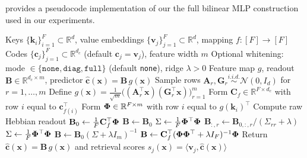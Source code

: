  provides a pseudocode implementation of our the full bilinear MLP construction used in our experiments.

\begin{algorithm}[t]
\caption{Sketched-$K_{2}$ Hebbian Construction with Optional Whitening}
\label{alg:sketched_k2_hebbian_whitening}
\begin{algorithmic}[1]
\REQUIRE Keys $\{\mathbf{k}_{i}\}_{i=1}^F\subset\mathbb{R}^d$, value embeddings $\{\mathbf{v}_{j}\}_{j=1}^F\subset\mathbb{R}^d$, mapping $f:[F]\to[F]$
\REQUIRE Codes $\{\mathbf{c}_{j}\}_{j=1}^F\subset\mathbb{R}^{d_c}$ (default $\mathbf{c}_{j}=\mathbf{v}_{j}$), feature width $m$
\REQUIRE Optional whitening: mode $\in\{\texttt{none},\texttt{diag},\texttt{full}\}$ (default \texttt{none}), ridge $\lambda>0$
\ENSURE Feature map $g$, readout $\mathbf{B}\in\mathbb{R}^{d_{c}\times m}$, predictor $\hat{\mathbf{c}}(\mathbf{x})=\mathbf{B}\,g(\mathbf{x})$
\STATE Sample rows $\mathbf{A}_{r},\mathbf{G}_{r}\stackrel{i.i.d.}{\sim}\mathcal{N}(0,I_{d})$ for $r=1,\dots,m$
\STATE Define $g(\mathbf{x})=\frac{1}{\sqrt{m}}\big((\mathbf{A}_{r}^\top \mathbf{x})(\mathbf{G}_{r}^\top \mathbf{x})\big)_{r=1}^m$
\STATE Form $\mathbf{C}_{f}\in\mathbb{R}^{F\times d_c}$ with row $i$ equal to $\mathbf{c}_{f(i)}^\top$
\STATE Form ${\bm{\Phi}}\in\mathbb{R}^{F\times m}$ with row $i$ equal to $g(\mathbf{k}_{i})^\top$
\STATE Compute raw Hebbian readout $\mathbf{B}_{0}\gets \frac{1}{F}\mathbf{C}_{f}^\top{\bm{\Phi}}$
  \STATE $\mathbf{B}\gets \mathbf{B}_{0}$
  \STATE $\Sigma\gets\frac{1}{F}{\bm{\Phi}}^\top{\bm{\Phi}}$
    \STATE $\mathbf{B}_{:,r}\gets \mathbf{B}_{0,:,r}/(\Sigma_{rr}+\lambda)$
  \ENDFOR
{}
    \STATE $\Sigma\gets\frac{1}{F}{\bm{\Phi}}^\top{\bm{\Phi}}$
    \STATE $\mathbf{B}\gets \mathbf{B}_{0}(\Sigma+\lambda I_{m})^{-1}$
  \ELSE
    \STATE $\mathbf{B}\gets \mathbf{C}_{f}^\top({\bm{\Phi}}{\bm{\Phi}}^\top+\lambda I_{F})^{-1}{\bm{\Phi}}$ 
  \ENDIF
\ENDIF
\STATE Return $\hat{\mathbf{c}}(\mathbf{x})=\mathbf{B}\,g(\mathbf{x})$ and retrieval scores $s_{j}(\mathbf{x})=\langle \mathbf{v}_{j},\hat{\mathbf{c}}(\mathbf{x})\rangle$
\end{algorithmic}
\end{algorithm}

